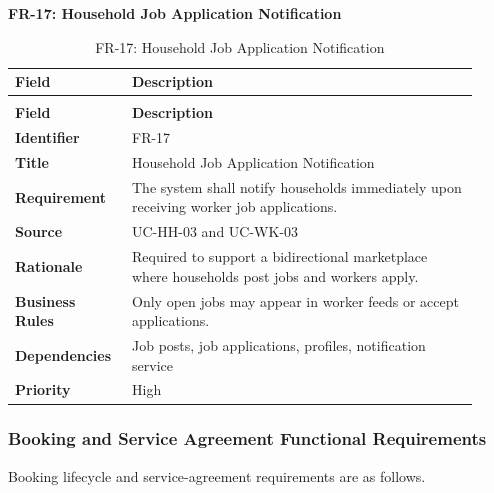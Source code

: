 \documentclass[12pt,a4paper]{article}
\begin{document}
\noindent\textbf{FR-17: Household Job Application Notification}\par
\vspace{4pt}
\begingroup\small\setlength{\tabcolsep}{4pt}\renewcommand{\arraystretch}{1.15}
\begin{longtable}{|>{\raggedright\arraybackslash}p{0.22\linewidth}|>{\raggedright\arraybackslash}p{0.70\linewidth}|}
\caption{FR-17: Household Job Application Notification}\label{tab:fr-17}\\
\hline
\textbf{Field} & \textbf{Description} \\ \hline
\endfirsthead
\multicolumn{2}{c}{Table \thetable\ Household Job Application Notification (continued)}\\
\hline
\textbf{Field} & \textbf{Description} \\ \hline
\endhead
\textbf{Identifier} & FR-17 \\ \hline
\textbf{Title} & Household Job Application Notification \\ \hline
\textbf{Requirement} & The system shall notify households immediately upon receiving worker job applications. \\ \hline
\textbf{Source} & UC-HH-03 and UC-WK-03 \\ \hline
\textbf{Rationale} & Required to support a bidirectional marketplace where households post jobs and workers apply. \\ \hline
\textbf{Business Rules} & Only open jobs may appear in worker feeds or accept applications. \\ \hline
\textbf{Dependencies} & Job posts, job applications, profiles, notification service \\ \hline
\textbf{Priority} & High \\ \hline
\end{longtable}
\endgroup

\subsubsection{Booking and Service Agreement Functional Requirements}
Booking lifecycle and service-agreement requirements are as follows.
\end{document}
